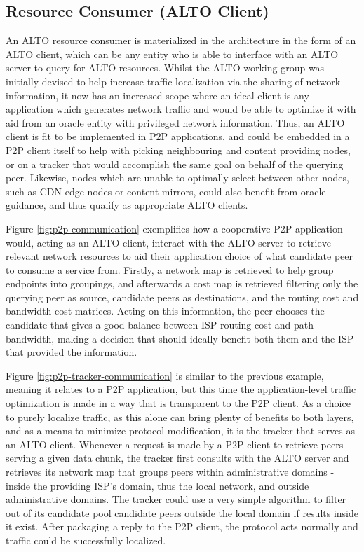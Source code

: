 \subsection{Resource Consumer (ALTO Client)}

    An ALTO resource consumer is materialized in the architecture in the form of an ALTO client, which can be any entity who is able to interface with an ALTO server to query for ALTO resources.
    Whilst the ALTO working group was initially devised to help increase traffic localization via the sharing of network information, it now has an increased scope where an ideal client is any application which generates network traffic and would be able to optimize it with aid from an oracle entity with privileged network information.
    Thus, an ALTO client is fit to be implemented in P2P applications, and could be embedded in a P2P client itself to help with picking neighbouring and content providing nodes, or on a tracker that would accomplish the same goal on behalf of the querying peer.
    Likewise, nodes which are unable to optimally select between other nodes, such as CDN edge nodes or content mirrors, could also benefit from oracle guidance, and thus qualify as appropriate ALTO clients.

    Figure \ref{fig:p2p-communication} exemplifies how a cooperative P2P application would, acting as an ALTO client, interact with the ALTO server to retrieve relevant network resources to aid their application choice of what candidate peer to consume a service from.
    Firstly, a network map is retrieved to help group endpoints into groupings, and afterwards a cost map is retrieved filtering only the querying peer as source, candidate peers as destinations, and the routing cost and bandwidth cost matrices.
    Acting on this information, the peer chooses the candidate that gives a good balance between ISP routing cost and path bandwidth, making a decision that should ideally benefit both them and the ISP that provided the information.

    Figure \ref{fig:p2p-tracker-communication} is similar to the previous example, meaning it relates to a P2P application, but this time the application-level traffic optimization is made in a way that is transparent to the P2P client.
    As a choice to purely localize traffic, as this alone can bring plenty of benefits to both layers, and as a means to minimize protocol modification, it is the tracker that serves as an ALTO client.
    Whenever a request is made by a P2P client to retrieve peers serving a given data chunk, the tracker first consults with the ALTO server and retrieves its network map that groups peers within administrative domains - inside the providing ISP's domain, thus the local network, and outside administrative domains.
    The tracker could use a very simple algorithm to filter out of its candidate pool candidate peers outside the local domain if results inside it exist.
    After packaging a reply to the P2P client, the protocol acts normally and traffic could be successfully localized.

